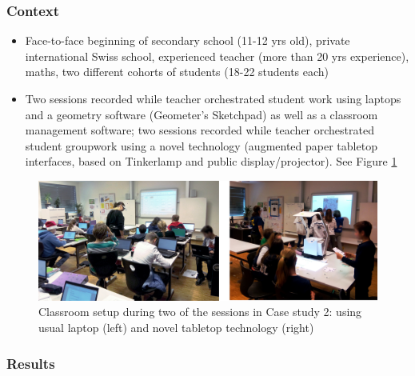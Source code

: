 \documentclass[10pt,journal,compsoc]{IEEEtran}
\begin{document}
\subsubsection{Context}

\begin{itemize}
\item Face-to-face beginning of secondary school (11-12 yrs old), private international Swiss school, experienced teacher (more than 20 yrs experience), maths, two different cohorts of students (18-22 students each)
\item Two sessions recorded while teacher orchestrated student work using laptops and a geometry software (Geometer's Sketchpad) as well as a classroom management software; two sessions recorded while teacher orchestrated student groupwork using a novel technology (augmented paper tabletop interfaces, based on Tinkerlamp \cite{do2012tinkerlamp} and public display/projector). See Figure \ref{fig:case2picture}
\end{itemize}

\begin{figure}[!t]
\centering
\includegraphics[width=\linewidth]{img/Case2Picture}
\caption{Classroom setup during two of the sessions in Case study 2: using usual laptop (left) and novel tabletop technology (right)}
\label{fig:case2picture}
\end{figure}

\subsubsection{Results}
\end{document}
